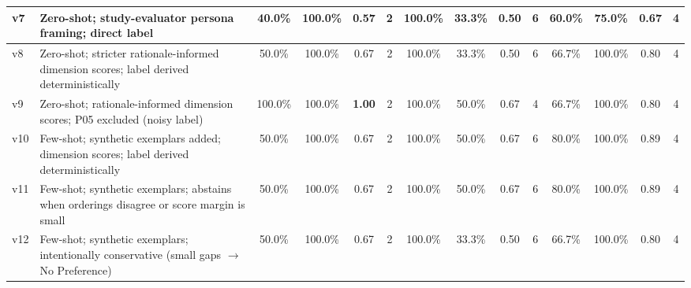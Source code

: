 \begin{table}[htbp]
{\begin{tabular}{|l|l|c|c|c|c|c|c|c|c|c|c|c|c|}
\hline
v7            & Zero-shot; study-evaluator persona framing; direct label                              & 40.0\%  & 100.0\% & 0.57          & 2  & 100.0\% & 33.3\% & 0.50 & 6  & 60.0\%  & 75.0\%  & 0.67          & 4  \\
\hline
v8            & Zero-shot; stricter rationale-informed dimension scores; label derived deterministically & 50.0\% & 100.0\% & 0.67          & 2  & 100.0\% & 33.3\% & 0.50 & 6  & 66.7\%  & 100.0\% & 0.80          & 4  \\
\hline
v9            & Zero-shot; rationale-informed dimension scores; P05 excluded (noisy label)            & 100.0\% & 100.0\% & \textbf{1.00} & 2  & 100.0\% & 50.0\% & 0.67 & 4  & 66.7\%  & 100.0\% & 0.80          & 4  \\
\hline
v10           & Few-shot; synthetic exemplars added; dimension scores; label derived deterministically & 50.0\%  & 100.0\% & 0.67          & 2  & 100.0\% & 50.0\% & 0.67 & 6  & 80.0\%  & 100.0\% & 0.89          & 4  \\
\hline
v11           & Few-shot; synthetic exemplars; abstains when orderings disagree or score margin is small & 50.0\% & 100.0\% & 0.67          & 2  & 100.0\% & 50.0\% & 0.67 & 6  & 80.0\%  & 100.0\% & 0.89          & 4  \\
\hline
v12           & Few-shot; synthetic exemplars; intentionally conservative (small gaps $\to$ No Preference) & 50.0\% & 100.0\% & 0.67        & 2  & 100.0\% & 33.3\% & 0.50 & 6  & 66.7\%  & 100.0\% & 0.80          & 4  \\
\hline
\end{tabular}}
\end{table}
